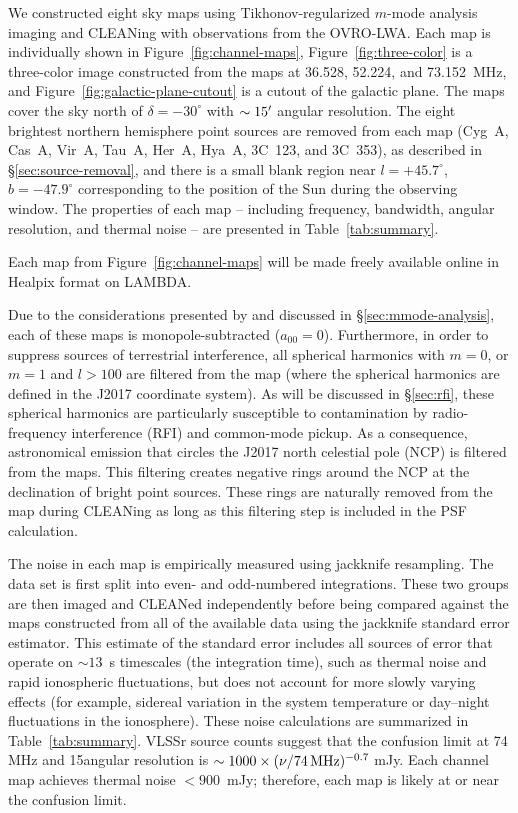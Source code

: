 \documentclass[twocolumn]{aastex61}
\begin{document}
We constructed eight sky maps using Tikhonov-regularized $m$-mode analysis imaging and CLEANing with
observations from the OVRO-LWA. Each map is individually shown in Figure~\ref{fig:channel-maps},
Figure~\ref{fig:three-color} is a three-color image constructed from the maps at 36.528,
52.224, and 73.152~MHz, and Figure~\ref{fig:galactic-plane-cutout} is a cutout of the galactic
plane. The maps cover the sky north of $\delta=-30^\circ$ with $\sim 15\mbox{$^\prime$}$ angular resolution.
The eight brightest northern hemisphere point sources are removed from each map (Cyg~A, Cas~A,
Vir~A, Tau~A, Her~A, Hya~A, 3C~123, and 3C~353), as described in \S\ref{sec:source-removal}, and
there is a small blank region near $l=+45.7^\circ$, $b=-47.9^\circ$ corresponding to the position of
the Sun during the observing window. The properties of each map -- including frequency, bandwidth,
angular resolution, and thermal noise -- are presented in Table~\ref{tab:summary}.

Each map from Figure~\ref{fig:channel-maps} will be made freely available online in Healpix format
\citep{2005ApJ...622..759G} on LAMBDA.

Due to the considerations presented by \citet{2016ApJ...826..116V} and discussed in
\S\ref{sec:mmode-analysis}, each of these maps is monopole-subtracted ($a_{00}=0$).  Furthermore, in
order to suppress sources of terrestrial interference, all spherical harmonics with $m=0$, or $m=1$
and $l>100$ are filtered from the map (where the spherical harmonics are defined in the J2017
coordinate system). As will be discussed in \S\ref{sec:rfi}, these spherical harmonics are
particularly susceptible to contamination by radio-frequency interference (RFI) and common-mode
pickup. As a consequence, astronomical emission that circles the J2017 north celestial pole (NCP) is
filtered from the maps.  This filtering creates negative rings around the NCP at the declination of
bright point sources.  These rings are naturally removed from the map during CLEANing as long as
this filtering step is included in the PSF calculation.

The noise in each map is empirically measured using jackknife resampling. The data set is first split
into even- and odd-numbered integrations. These two groups are then imaged and CLEANed
independently before being compared against the maps constructed from all of the available data
using the jackknife standard error estimator. This estimate of the standard error includes all
sources of error that operate on $\sim13$~s timescales (the integration time), such as thermal
noise and rapid ionospheric fluctuations, but does not account for more slowly varying effects (for
example, sidereal variation in the system temperature or day--night fluctuations in the ionosphere).
These noise calculations are summarized in Table~\ref{tab:summary}.  VLSSr source counts
\citep{2014MNRAS.440..327L} suggest that the confusion limit at 74 MHz and 15\arcmin angular
resolution is $\sim 1000\times(\nu/74\,{\rm MHz})^{-0.7}$ mJy.  Each channel map achieves thermal
noise $<900$~mJy; therefore, each map is likely at or near the confusion limit.
\end{document}
